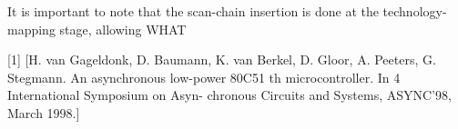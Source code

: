 It is important to note that the scan-chain insertion is done at the
technology-mapping stage, allowing WHAT

[1] [H. van Gageldonk, D. Baumann,
  K. van Berkel, D. Gloor, A.
Peeters, G. Stegmann. An asynchronous low-power 80C51
                     th
microcontroller. In 4 International Symposium on Asyn-
chronous Circuits and Systems, ASYNC’98, March 1998.]

